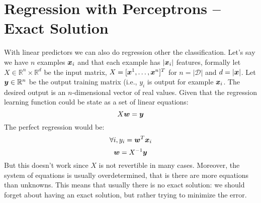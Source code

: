 \section{Regression with Perceptrons -- Exact Solution}
With linear predictors we can also do regression other the classification. \newline
Let's say we have $n$ examples $\bm{x}_i$ and that each example has $\vert \bm{x}_i\vert$ features, formally let $X\in\mathbb{R}^n\times\mathbb{R}^d$ be the input matrix, $X=[\bm{x}^1,\hdots,\bm{x}^n]^T$ for $n=\vert\mathcal{D}\vert$ and $d=\vert\bm{x}\vert$. \newline
Let $\bm{y}\in\mathbb{R}^n$ be the output training matrix (i.e., $y_i$ is output for example $\bm{x}_i$. The desired output is an $n$-dimensional vector of real values. \newline
Given that the regression learning function could be state as a set of linear equations:
\[X\bm{w}=\bm{y}\]
The perfect regression would be:
\[\forall i, y_i=\bm{w}^T\bm{x}_i\]
\[\bm{w}=X^{-1}\bm{y}\]
But this doesn't work since $X$ is not revertible in many cases. Moreover, the system of equations is usually overdetermined, that is there are more equations than unknowns. This means that usually there is no exact solution: we should forget about having an exact solution, but rather trying to minimize the error.
%
%
